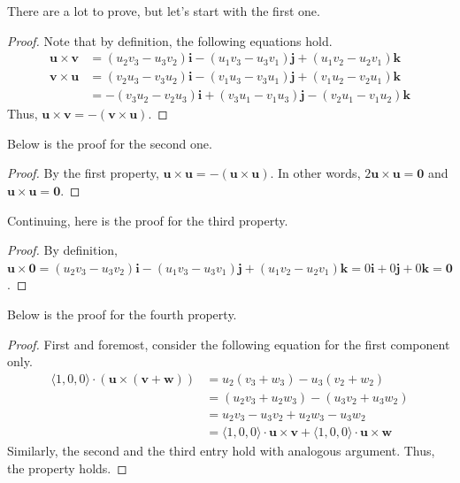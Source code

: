 \documentclass[../../../main.tex]{subfiles}
\begin{document}
There are a lot to prove, but let's start with the first one.

\begin{proof}
Note that by definition, the following equations hold.
\begin{align*}
    \mathbf{u} \times \mathbf{v}
    &= (u_2v_3 - u_3v_2) \mathbf{i} - (u_1v_3 - u_3v_1) \mathbf{j}
        + (u_1v_2 - u_2v_1) \mathbf{k} \\
    \mathbf{v} \times \mathbf{u}
    &= (v_2u_3 - v_3u_2) \mathbf{i} - (v_1u_3 - v_3u_1) \mathbf{j}
        + (v_1u_2 - v_2u_1) \mathbf{k} \\
    &= -(v_3u_2 - v_2u_3) \mathbf{i} + (v_3u_1 - v_1u_3) \mathbf{j}
        - (v_2u_1 - v_1u_2) \mathbf{k}
\end{align*}
Thus, $\mathbf{u} \times \mathbf{v} =
- (\mathbf{v} \times \mathbf{u})$.
\end{proof}

Below is the proof for the second one.

\begin{proof}
By the first property, $\mathbf{u} \times \mathbf{u} =
- (\mathbf{u} \times \mathbf{u})$. In other words,
$2 \mathbf{u} \times \mathbf{u} = \mathbf{0}$ and
$\mathbf{u} \times \mathbf{u} = \mathbf{0}$.
\end{proof}

Continuing, here is the proof for the third property.

\begin{proof}
By definition, $\mathbf{u} \times \mathbf{0} = (u_2v_3 - u_3v_2)
\mathbf{i} - (u_1v_3 - u_3v_1) \mathbf{j} + (u_1v_2 - u_2v_1)
\mathbf{k} = 0\mathbf{i} + 0\mathbf{j} + 0\mathbf{k} = \mathbf{0}$.
\end{proof}

Below is the proof for the fourth property.

\begin{proof}
First and foremost, consider the following equation for the
first component only.
\begin{align*}
    \langle 1, 0, 0 \rangle \cdot
        (\mathbf{u} \times (\mathbf{v} + \mathbf{w}))
    &= u_2(v_3 + w_3) - u_3(v_2 + w_2) \\
    &= (u_2v_3 + u_2w_3) - (u_3v_2 + u_3w_2) \\
    &= u_2v_3 - u_3v_2 + u_2w_3 - u_3w_2 \\
    &= \langle 1, 0, 0 \rangle \cdot \mathbf{u} \times \mathbf{v}
        + \langle 1, 0, 0 \rangle \cdot \mathbf{u} \times \mathbf{w}
\end{align*}
Similarly, the second and the third entry hold with analogous
argument. Thus, the property holds.
\end{proof}
\end{document}
